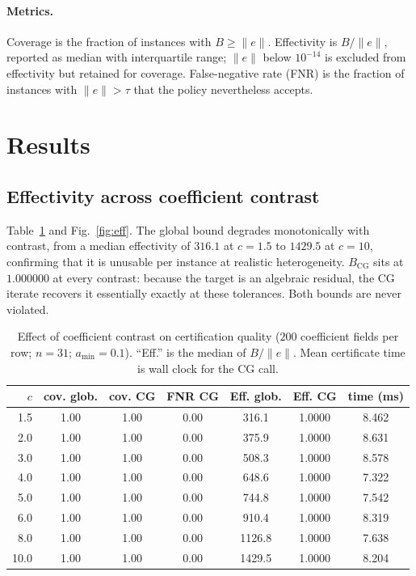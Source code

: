 \documentclass[journal]{IEEEtran}
\theoremstyle{plain}
\theoremstyle{definition}
\begin{document}
\paragraph{Metrics.} Coverage is the fraction of instances with $B\ge\|e\|$. Effectivity
is $B/\|e\|$, reported as median with interquartile range; $\|e\|$ below $10^{-14}$ is
excluded from effectivity but retained for coverage. False-negative rate (FNR) is the
fraction of instances with $\|e\|>\tau$ that the policy nevertheless accepts.

\section{Results}\label{sec:results}
\subsection{Effectivity across coefficient contrast}
Table~\ref{tab:contrast} and Fig.~\ref{fig:eff}. The global bound degrades
monotonically with contrast, from a median effectivity of $316.1$ at $c=1.5$ to
$1429.5$ at $c=10$, confirming that it is unusable per instance at realistic
heterogeneity. $B_{\mathrm{CG}}$ sits at $1.000000$ at every contrast: because the
target is an algebraic residual, the CG iterate recovers it essentially exactly at
these tolerances. Both bounds are never violated.

\begin{table}[t]
\centering
\caption{Effect of coefficient contrast on certification quality ($200$ coefficient
fields per row; $n=31$; $a_{\min}=0.1$). ``Eff.'' is the median of $B/\|e\|$.
Mean certificate time is wall clock for the CG call.}
\label{tab:contrast}
\begin{tabular}{rcccccc}
\toprule
$c$ & cov. glob. & cov. CG & FNR CG & Eff. glob. & Eff. CG & time (ms)\\
\midrule
1.5 & 1.00 & 1.00 & 0.00 & 316.1 & 1.0000 & 8.462 \\
2.0 & 1.00 & 1.00 & 0.00 & 375.9 & 1.0000 & 8.631 \\
3.0 & 1.00 & 1.00 & 0.00 & 508.3 & 1.0000 & 8.578 \\
4.0 & 1.00 & 1.00 & 0.00 & 648.6 & 1.0000 & 7.322 \\
5.0 & 1.00 & 1.00 & 0.00 & 744.8 & 1.0000 & 7.542 \\
6.0 & 1.00 & 1.00 & 0.00 & 910.4 & 1.0000 & 8.319 \\
8.0 & 1.00 & 1.00 & 0.00 & 1126.8 & 1.0000 & 7.638 \\
10.0 & 1.00 & 1.00 & 0.00 & 1429.5 & 1.0000 & 8.204 \\
\bottomrule
\end{tabular}
\end{table}
\end{document}
